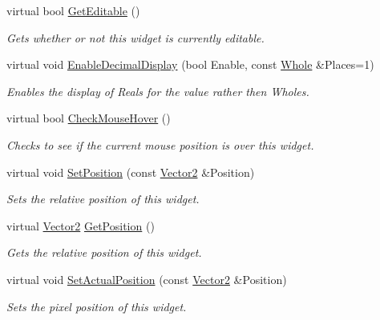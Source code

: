 \begin{DoxyCompactItemize}
virtual bool \hyperlink{classphys_1_1UI_1_1Spinner_a32005fcea4898c07cd469aa70cad3016}{GetEditable} ()
\begin{DoxyCompactList}\small\item\em Gets whether or not this widget is currently editable. \item\end{DoxyCompactList}\item 
virtual void \hyperlink{classphys_1_1UI_1_1Spinner_a66719b7ef5896598a12942b6dc148b21}{EnableDecimalDisplay} (bool Enable, const \hyperlink{namespacephys_a460f6bc24c8dd347b05e0366ae34f34a}{Whole} \&Places=1)
\begin{DoxyCompactList}\small\item\em Enables the display of Reals for the value rather then Wholes. \item\end{DoxyCompactList}\item 
virtual bool \hyperlink{classphys_1_1UI_1_1Spinner_ae594a38213702563841f5817609c492e}{CheckMouseHover} ()
\begin{DoxyCompactList}\small\item\em Checks to see if the current mouse position is over this widget. \item\end{DoxyCompactList}\item 
virtual void \hyperlink{classphys_1_1UI_1_1Spinner_a7b520a5aa26772bd15e880887d174fa6}{SetPosition} (const \hyperlink{classphys_1_1Vector2}{Vector2} \&Position)
\begin{DoxyCompactList}\small\item\em Sets the relative position of this widget. \item\end{DoxyCompactList}\item 
virtual \hyperlink{classphys_1_1Vector2}{Vector2} \hyperlink{classphys_1_1UI_1_1Spinner_a0cfed1bd9532351eac373b0f23495225}{GetPosition} ()
\begin{DoxyCompactList}\small\item\em Gets the relative position of this widget. \item\end{DoxyCompactList}\item 
virtual void \hyperlink{classphys_1_1UI_1_1Spinner_a66bc26a2252cacd71e8c409e35672909}{SetActualPosition} (const \hyperlink{classphys_1_1Vector2}{Vector2} \&Position)
\begin{DoxyCompactList}\small\item\em Sets the pixel position of this widget. \item\end{DoxyCompactList}\item 

\end{DoxyCompactItemize}
